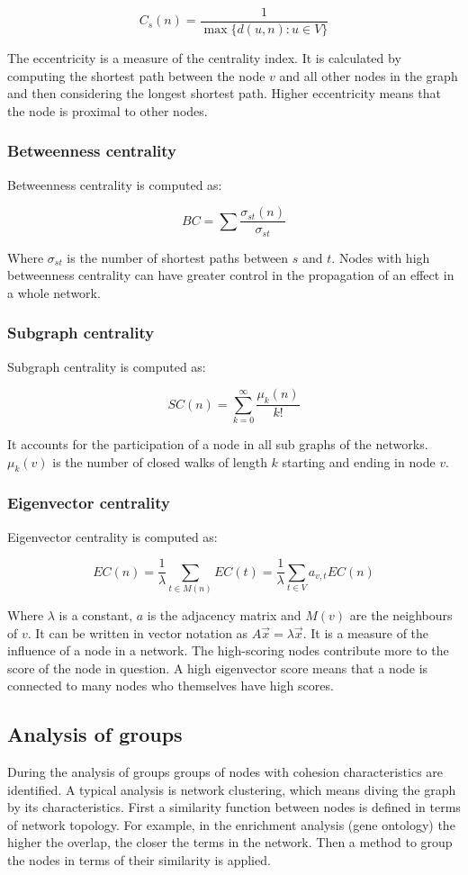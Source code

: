 		$$C_s(n) = \frac{1}{\max\{d(u,n):u\in V\}}$$

		The eccentricity is a measure of the centrality index.
		It is calculated by computing the shortest path between the node $v$ and all other nodes in the graph and then considering the longest shortest path.
		Higher eccentricity means that the node is proximal to other nodes.

		\subsubsection{Betweenness centrality}
		Betweenness centrality is computed as:

		$$BC = \sum\frac{\sigma_{st}(n)}{\sigma_{st}}$$

		Where $\sigma_{st}$ is the number of shortest paths between $s$ and $t$.
		Nodes with high betweenness centrality can have greater control in the propagation of an effect in a whole network.

		\subsubsection{Subgraph centrality}
		Subgraph centrality is computed as:

		$$SC(n) = \sum\limits_{k=0}^\infty \frac{\mu_k(n)}{k!}$$

		It accounts for the participation of a node in all sub graphs of the networks.
		$\mu_k(v)$ is the number of closed walks of length $k$ starting and ending in node $v$.

		\subsubsection{Eigenvector centrality}
		Eigenvector centrality is computed as:

		$$EC(n) = \frac{1}{\lambda}\sum\limits_{t\in M(n)} EC(t) = \frac{1}{\lambda}\sum\limits_{t\in V} a_{v,t}EC(n)$$

		Where $\lambda$ is a constant, $a$ is the adjacency matrix and $M(v)$ are the neighbours of $v$.
		It can be written in vector notation as $A\vec{x} = \lambda\vec{x}$.
		It is a measure of the influence of a node in a network.
		The high-scoring nodes contribute more to the score of the node in question.
		A high eigenvector score means that a node is connected to many nodes who themselves have high scores.

	\subsection{Analysis of groups}
	During the analysis of groups groups of nodes with cohesion characteristics are identified.
	A typical analysis is network clustering, which means diving the graph by its characteristics.
	First a similarity function between nodes is defined in terms of network topology.
	For example, in the enrichment analysis (gene ontology) the higher the overlap, the closer the terms in the network.
	Then a method to group the nodes in terms of their similarity is applied.

